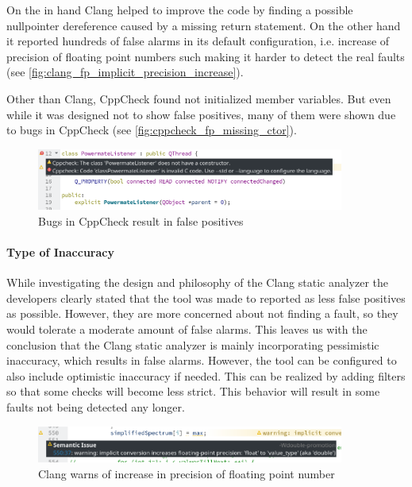 \documentclass{scrartcl}
\begin{document}
On the in hand Clang helped to improve the code by finding a possible nullpointer dereference caused by a missing return statement. On the other hand it reported hundreds of false alarms in its default configuration, i.e. increase of precision of floating point numbers such making it harder to detect the real faults (see \vref{fig:clang_fp_implicit_precision_increase}).

Other than Clang, CppCheck found not initialized member variables. But even while it was designed not to show false positives, many of them were shown due to bugs in CppCheck (see \vref{fig:cppcheck_fp_missing_ctor}).

\begin{figure}[h]
	\centering
	\includegraphics[width=0.9\textwidth]{img/cppcheck_fp_missing_ctor}
	\caption[Bugs in CppCheck]{Bugs in CppCheck result in false positives}
	\label{fig:cppcheck_fp_missing_ctor}
\end{figure}

\paragraph{Type of Inaccuracy}

While investigating the design and philosophy of the Clang static analyzer the developers clearly stated that the tool was made to reported as less false positives as possible. However, they are more concerned about not finding a fault, so they would tolerate a moderate amount of false alarms. This leaves us with the conclusion that the Clang static analyzer is mainly incorporating pessimistic inaccuracy, which results in false alarms. However, the tool can be configured to also include optimistic inaccuracy if needed. This can be realized by adding filters so that some checks will become less strict. This behavior will result in some faults not being detected any longer.

\begin{figure}[h]
	\centering
	\includegraphics[width=0.9\textwidth]{img/clang_fp_implicit_precision_increase}
	\caption[Clang warns of increase in precision]{Clang warns of increase in precision of floating point number}
	\label{fig:clang_fp_implicit_precision_increase}
\end{figure}
\end{document}

